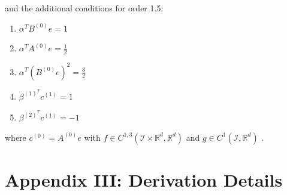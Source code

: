 \documentclass{article}
\begin{document}
and the additional conditions for order 1.5:

\begin{multicols}{3}
	\begin{enumerate}
		\item $\alpha^{T}B^{(0)}e=1$
		\item $\alpha^{T}A^{(0)}e=\frac{1}{2}$
		\item $\alpha^{T}\left(B^{(0)}e\right)^{2}=\frac{3}{2}$
		\item $\beta^{(1)^{T}}c^{(1)}=1$
		\item $\beta^{(2)^{T}}c^{(1)}=-1$
	\end{enumerate}
\end{multicols}

where $c^{(0)}=A^{(0)}e$ with $f\in C^{1,3}(\mathcal{I}\times\mathbb{R}^{d},\mathbb{R}^{d})$
and $g\in C^{1}(\mathcal{I},\mathbb{R}^{d})$ \cite{RN2707}.

\section{Appendix III: Derivation Details}
\end{document}
